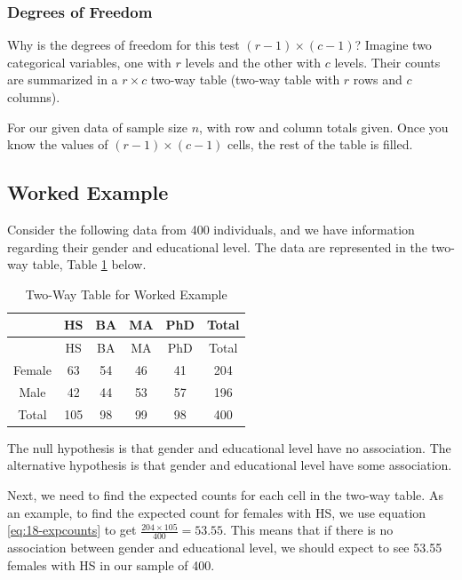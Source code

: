 \documentclass[
]{book}
\theoremstyle{definition}
\theoremstyle{definition}
\theoremstyle{definition}
\theoremstyle{definition}
\theoremstyle{remark}
\begin{document}
\hypertarget{degrees-of-freedom-1}{%
\subsubsection{Degrees of Freedom}\label{degrees-of-freedom-1}}

Why is the degrees of freedom for this test \((r-1) \times (c-1)\)? Imagine two categorical variables, one with \(r\) levels and the other with \(c\) levels. Their counts are summarized in a \(r \times c\) two-way table (two-way table with \(r\) rows and \(c\) columns).

For our given data of sample size \(n\), with row and column totals given. Once you know the values of \((r-1) \times (c-1)\) cells, the rest of the table is filled.

\hypertarget{worked-example-8}{%
\subsection{Worked Example}\label{worked-example-8}}

Consider the following data from 400 individuals, and we have information regarding their gender and educational level. The data are represented in the two-way table, Table \ref{tab:eg2way} below.

\begin{longtable}[]{@{}cccccc@{}}
\caption{\label{tab:eg2way} Two-Way Table for Worked Example}\tabularnewline
\toprule\noalign{}
& HS & BA & MA & PhD & Total \\
\midrule\noalign{}
\endfirsthead
\toprule\noalign{}
& HS & BA & MA & PhD & Total \\
\midrule\noalign{}
\endhead
\bottomrule\noalign{}
\endlastfoot
Female & 63 & 54 & 46 & 41 & 204 \\
Male & 42 & 44 & 53 & 57 & 196 \\
Total & 105 & 98 & 99 & 98 & 400 \\
\end{longtable}

The null hypothesis is that gender and educational level have no association. The alternative hypothesis is that gender and educational level have some association.

Next, we need to find the expected counts for each cell in the two-way table. As an example, to find the expected count for females with HS, we use equation \eqref{eq:18-expcounts} to get \(\frac{204 \times 105}{400} = 53.55\). This means that if there is no association between gender and educational level, we should expect to see 53.55 females with HS in our sample of 400.
\end{document}
